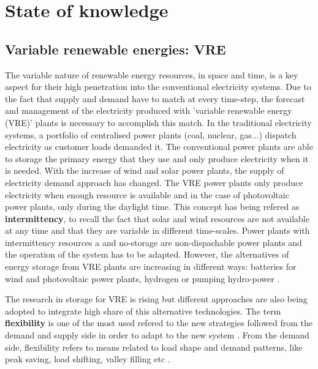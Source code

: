  
\chapter{State of knowledge\label{cha:state}}


\section{Variable renewable energies: VRE}

The variable nature of renewable energy resources, in space and time, is a key aspect for their high penetration into the conventional electricity systems. Due to the fact that supply and demand have to match at every time-step, the forecast and management of the electricity produced with 'variable renewable energy (VRE)' plants is necessary to accomplish this match. In the traditional electricity systems, a portfolio of centralised power plants (coal, nuclear, gas...) dispatch electricity as customer loads demanded it. The conventional power plants are able to storage the primary energy that they use and only produce electricity when it is needed. With the increase of wind and solar power plants, the supply of electricity demand approach has changed. The VRE power plants only produce electricity when enough resource is available and in the case of photovoltaic power plants, only during the daylight time. This concept has being refered as \textbf{intermittency}, to recall the fact that solar and wind resources are not available at any time and that they are variable in different time-scales. Power plants with intermittency resources a and no-storage are non-dispachable power plants and the operation of the system has to be adapted. However, the alternatives of energy storage from VRE plants are increasing in different ways: batteries for wind and photovoltaic power plants, hydrogen or pumping hydro-power \cite*{Lund2015, Blanco2018, Schaber2004}.

The research in storage for VRE is rising but different approaches are also being adopted to integrate high share of this alternative technologies. The term \textbf{flexibility} is one of the most used refered to the new strategies followed from the demand and supply side in order to adapt to the new system \cite*{KROPOSKI2017}. From the demand side, flexibility refers to means related to load shape and demand patterns, like peak saving, load shifting, valley filling etc \cite*{Lund2015}.


